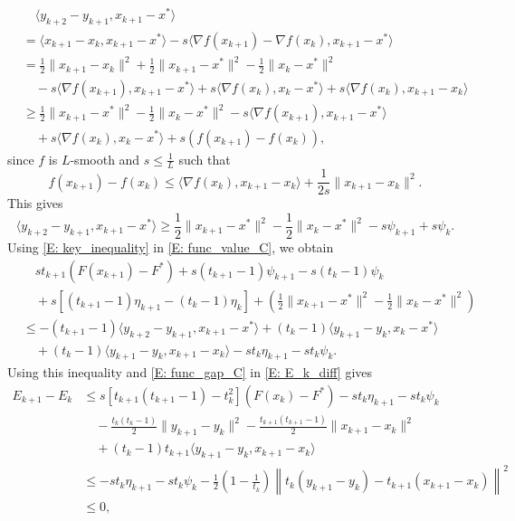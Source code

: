 \documentclass[pdflatex,sn-mathphys-num]{sn-jnl}
\theoremstyle{thmstyleone}
\theoremstyle{thmstyletwo}
\theoremstyle{thmstylethree}
\begin{document}
\begin{align*}
&\quad \langle y_{k+2}-y_{k+1}, x_{k+1}-x^* \rangle \\
&= \langle x_{k+1}-x_k, x_{k+1}-x^* \rangle
  - s \langle \nabla f(x_{k+1})-\nabla f(x_k), x_{k+1}-x^* \rangle \\
&= \frac{1}{2}\| x_{k+1}-x_k \|^2 + \frac{1}{2}\| x_{k+1}-x^* \|^2 
   - \frac{1}{2}\| x_k-x^* \|^2 \\
&\quad -s\langle \nabla f(x_{k+1}), x_{k+1}-x^* \rangle
   + s \langle \nabla f(x_k), x_k-x^* \rangle
   + s \langle \nabla f(x_k), x_{k+1}-x_k \rangle \\
&\ge \frac{1}{2}\| x_{k+1}-x^* \|^2 - \frac{1}{2}\| x_k-x^* \|^2 
   -s\langle \nabla f(x_{k+1}), x_{k+1}-x^* \rangle \\
&\quad + s \langle \nabla f(x_k), x_k-x^* \rangle 
   + s( f(x_{k+1}) - f(x_k) ),
\end{align*}
since $f$ is $L$-smooth and $s\le \frac{1}{L}$ such that
$$ f(x_{k+1}) - f(x_k) \le \langle \nabla f(x_k), x_{k+1}-x_k \rangle + \frac{1}{2s}\| x_{k+1}-x_k \|^2. $$
This gives
\begin{equation}\label{E: key_inequality}
\langle y_{k+2}-y_{k+1}, x_{k+1}-x^* \rangle \ge \frac{1}{2}\| x_{k+1}-x^* \|^2 - \frac{1}{2}\| x_k-x^* \|^2 - s\psi_{k+1} + s \psi_k.
\end{equation}
Using \eqref{E: key_inequality} in \eqref{E: func_value_C}, we obtain
\begin{align*}
&\quad st_{k+1}\left( F(x_{k+1}) - F^* \right) 
  + s(t_{k+1}-1)\psi_{k+1} - s(t_k-1)\psi_k \\ 
&\quad + s[ (t_{k+1}-1)\eta_{k+1} - (t_k-1)\eta_k ] 
  + \left( \frac{1}{2}\| x_{k+1}-x^* \|^2 - \frac{1}{2}\| x_k-x^* \|^2 \right) \\
&\le - (t_{k+1}-1)\langle y_{k+2}-y_{k+1}, x_{k+1}-x^* \rangle 
   + (t_k-1)\langle y_{k+1}-y_k, x_k-x^* \rangle \\
&\quad + (t_k-1)\langle y_{k+1}-y_k, x_{k+1}-x_k \rangle
   - st_k\eta_{k+1} 
   - st_k\psi_k. 
\end{align*}
Using this inequality and \eqref{E: func_gap_C} in \eqref{E: E_k_diff} gives
\begin{equation}\label{E: E_k_diff_bound_temp}
\begin{aligned}
E_{k+1}-E_k  
&\le s[t_{k+1}(t_{k+1}-1)-t_k^2]\left( F(x_k) - F^* \right)
     - st_k\eta_{k+1} 
     - st_k\psi_k \\
&\quad - \frac{t_k(t_k-1)}{2}\| y_{k+1} - y_k \|^2 
   - \frac{t_{k+1}(t_{k+1}-1)}{2}\| x_{k+1} - x_k \|^2 \\ 
&\quad + (t_k-1)t_{k+1} \langle y_{k+1}-y_k, x_{k+1} - x_k \rangle\\
&\le - st_k\eta_{k+1} - st_k\psi_k 
   - \frac{1}{2}\left( 1 - \frac{1}{t_k} \right) \left\| t_k(y_{k+1}-y_k) - t_{k+1}(x_{k+1}-x_k) \right\|^2 \\ 
&\le 0,
\end{aligned}
\end{equation}
\end{document}

